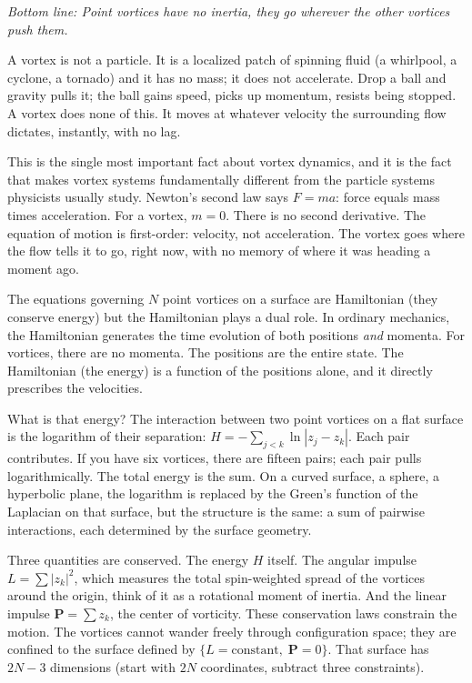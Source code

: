 \medskip

\noindent\textit{Bottom line: Point vortices have no inertia, they go
wherever the other vortices push them.}

\medskip

A vortex is not a particle. It is a localized patch of spinning
fluid (a whirlpool, a cyclone, a tornado) and it has no mass; it
does not accelerate. Drop a ball and gravity pulls it; the ball gains
speed, picks up momentum, resists being stopped. A vortex does none
of this. It moves at whatever velocity the surrounding flow dictates,
instantly, with no lag.

This is the single most important fact about vortex dynamics, and it is
the fact that makes vortex systems fundamentally different from the
particle systems physicists usually study. Newton's second law says
$F = ma$: force equals mass times acceleration. For a vortex, $m = 0$.
There is no second derivative. The equation of motion is first-order:
velocity, not acceleration. The vortex goes where the flow tells it to
go, right now, with no memory of where it was heading a moment ago.

The equations governing $N$ point vortices on a surface are Hamiltonian
 (they conserve energy) but the Hamiltonian plays a dual role. In
ordinary mechanics, the Hamiltonian generates the time evolution of
both positions \emph{and} momenta. For vortices, there are no momenta.
The positions are the entire state. The Hamiltonian (the energy) is a
function of the positions alone, and it directly prescribes the
velocities.

What is that energy? The interaction between two point vortices on a
flat surface is the logarithm of their separation:
$H = -\sum_{j<k}\ln|z_j - z_k|$. Each pair contributes. If you have
six vortices, there are fifteen pairs; each pair pulls logarithmically.
The total energy is the sum. On a curved surface, a sphere, a
hyperbolic plane, the logarithm is replaced by the Green's function
of the Laplacian on that surface, but the structure is the same: a sum
of pairwise interactions, each determined by the surface geometry.

Three quantities are conserved. The energy $H$ itself. The angular
impulse $L = \sum|z_k|^2$, which measures the total spin-weighted
spread of the vortices around the origin, think of it as a rotational
moment of inertia. And the linear impulse $\mathbf{P} = \sum z_k$, the
center of vorticity. These conservation laws constrain the motion.
The vortices cannot wander freely through configuration space; they are
confined to the surface defined by $\{L = \text{constant},\;
\mathbf{P} = 0\}$. That surface has $2N - 3$ dimensions (start with
$2N$ coordinates, subtract three constraints).

